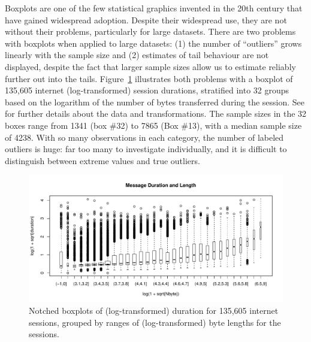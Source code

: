 \documentclass[oneside]{article}
\begin{document}


Boxplots are one of the few statistical graphics invented in the 20th century that have gained widespread adoption. Despite their widespread use, they are not without their problems, particularly for large datasets. There are two problems with boxplots when applied to large datasets: (1) the number of ``outliers'' grows linearly with the sample size and (2) estimates of tail behaviour are not displayed, despite the fact that larger sample sizes allow us to estimate reliably further out into the tails. Figure~\ref{fig:internet-bp} illustrates both problems with a boxplot of 135,605 internet (log-transformed) session durations, stratified into 32 groups based on the logarithm of the number of bytes transferred during the session. See \citet{kw06} for further details about the data and transformations. The sample sizes in the 32 boxes range from 1341 (box \#32) to 7865 (Box \#13), with a median sample size of 4238. With so many observations in each category, the number of labeled outliers is huge: far too many to investigate individually, and it is difficult to distinguish between extreme values and true outliers.

\begin{figure}[hbtp]
  \centering
  \includegraphics[width=\linewidth]{box2}

  \caption{Notched boxplots \citep{variations.boxplots} of (log-transformed)
  duration for 135,605 internet sessions, grouped by ranges of
  (log-transformed) byte lengths for the sessions.}

  \label{fig:internet-bp} 
\end{figure}
\end{document}
